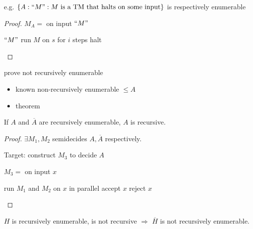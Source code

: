 e.g. $\{ A: {``M"}: M \text{ is a TM that halts on some input} \}$ is respectively enumerable
\begin{proof}
    $M_A=$ on input ${``M"}$
    \begin{algorithm}[H]
        \caption{$M_A$}
        \begin{algorithmic}
            \Require ${``M"}$
                    \State run $M$ on $s$ for $i$ steps
                        \State halt
                    \EndIf
                \EndFor
            \EndFor
        \end{algorithmic}
    \end{algorithm}
    
\end{proof}

prove not recursively enumerable
\begin{itemize}
    \item known non-recursively enumerable $\le A$
    \item theorem
\end{itemize}

\begin{theorem}
    If $A$ and $\overline{A}$ are recursively enumerable, $A$ is recursive. 
\end{theorem}
\begin{proof}
    $\exists M_1, M_2$ semidecides $A, \overline{A}$ respectively.

    Target: construct $M_3$ to decide $A$

    $M_3=$ on input $x$
    \begin{algorithm}[H]
        \caption{$M_3$}
        \begin{algorithmic}
            \State run $M_1$ and $M_2$ on $x$ in parallel
                \State accept $x$
                \State reject $x$
            \EndIf
        \end{algorithmic}
    \end{algorithm}
\end{proof}

$H$ is recursively enumerable, is not recursive $\Rightarrow $ $\overline{H}$ is not recursively enumerable. 


